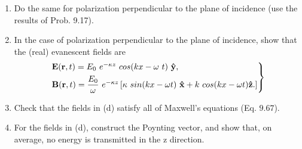 \documentclass[fleqn]{article}
\begin{document}
\begin{enumerate}
\begin{enumerate}

      \item Do the same for polarization perpendicular to the plane of incidence (use the
      results of Prob. 9.17).


      \item In the case of polarization perpendicular to the plane of incidence, show that
      the (real) evanescent fields are
      $$
        \begin{rcases*}
          \mathbf{E(r},t)=E_0 ~ e^{-\kappa z} ~ cos(kx-\omega ~ t) ~ \mathbf{\hat{y}},
          \\
          \mathbf{B(r},t)=\dfrac{E_0}{\omega} ~ e^{-\kappa z} \left[
            \kappa ~ sin(kx-\omega t) ~ \mathbf{\hat{x}}+k ~ cos(kx-\omega t) \mathbf{\hat{z}}.
          \right]
        \end{rcases*}
      $$


      \item Check that the fields in (d) satisfy all of Maxwell’s equations (Eq. $9.67$).
      


      \item For the fields in (d), construct the Poynting vector, and show that, on average, no energy is transmitted in the z direction.
      

    \end{enumerate}

  \end{enumerate}
\end{document}
